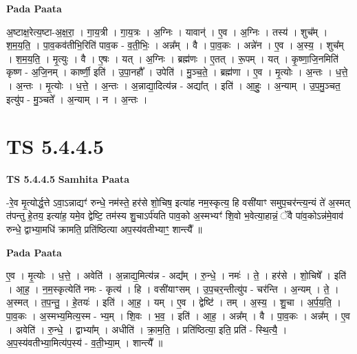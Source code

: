 \documentclass[17pt]{extarticle}
\begin{document}
\textbf{Pada Paata} \newline

अ॒ष्टाक्ष॒रेत्य॒ष्टा-अ॒क्ष॒रा॒ । गा॒य॒त्री । गा॒य॒त्रः । अ॒ग्निः । यावान्॑ । ए॒व । अ॒ग्निः । तस्य॑ । शुच᳚म् । श॒म॒य॒ति॒ । पा॒व॒कव॑तीभि॒रिति॑ पाव॒क - व॒ती॒भिः॒ । अन्न᳚म् । वै । पा॒व॒कः । अन्ने॑न । ए॒व । अ॒स्य॒ । शुच᳚म् । श॒म॒य॒ति॒ । मृ॒त्युः । वै ।   ए॒षः । यत् । अ॒ग्निः । ब्रह्म॑णः । ए॒तत् । रू॒पम् । यत् । कृ॒ष्णा॒जि॒नमिति॑ कृष्ण - अ॒जि॒नम् । कार्ष्णी॒ इति॑ । उ॒पा॒नहौ᳚ । उपेति॑ । मु॒ञ्च॒ते॒ । ब्रह्म॑णा । ए॒व । मृ॒त्योः । अ॒न्तः । ध॒त्ते॒ । अ॒न्तः । मृ॒त्योः । ध॒त्ते॒ । अ॒न्तः । अ॒न्नाद्या॒दित्य॑न्न - अद्या᳚त् । इति॑ । आ॒हुः॒ । अ॒न्याम् । उ॒प॒मु॒ञ्चत॒ इत्यु॑प - मु॒ञ्चते᳚ । अ॒न्याम् । न । अ॒न्तः ।  \newline




\section*{ TS 5.4.4.5 }

\textbf{TS 5.4.4.5 } \newline
\textbf{Samhita Paata} \newline

-रे॒व मृ॒त्योर्द्ध॒त्ते ऽवा॒ऽन्नाद्यꣳ॑ रुन्धे॒ नम॑स्ते॒ हर॑से शो॒चिष॒ इत्या॑ह नम॒स्कृत्य॒ हि वसी॑याꣳ समुप॒चर॑न्त्य॒न्यं ते॑ अ॒स्मत् त॑पन्तु हे॒तय॒ इत्या॑ह॒ यमे॒व द्वेष्टि॒ तम॑स्य शु॒चाऽर्प॑यति पाव॒को अ॒स्मभ्यꣳ॑ शि॒वो भ॒वेत्या॒हान्नं॒ ॅवै पा॑व॒कोऽन्न॑मे॒वाव॑ रुन्धे॒ द्वाभ्या॒मधि॑ क्रामति॒ प्रति॑ष्ठित्या अप॒स्य॑वतीभ्याꣳ॒॒ शान्त्यै᳚ ॥ \newline

\textbf{Pada Paata} \newline

ए॒व । मृ॒त्योः । ध॒त्ते॒ । अवेति॑ । अ॒न्नाद्य॒मित्य॑न्न - अद्य᳚म् । रु॒न्धे॒ । नमः॑ । ते॒ । हर॑से । शो॒चिषे᳚ । इति॑ । आ॒ह॒ । न॒म॒स्कृत्येति॑ नमः - कृत्य॑ । हि । वसी॑याꣳसम् । उ॒प॒चर॒न्तीत्यु॑प - चर॑न्ति । अ॒न्यम् । ते॒ । अ॒स्मत् । त॒प॒न्तु॒ । हे॒तयः॑ । इति॑ । आ॒ह॒ । यम् । ए॒व । द्वेष्टि॑ । तम् । अ॒स्य॒ । शु॒चा । अ॒र्प॒य॒ति॒ । पा॒व॒कः । अ॒स्मभ्य॒मित्य॒स्म - भ्य॒म् । शि॒वः । भ॒व॒ । इति॑ । आ॒ह॒ । अन्न᳚म् । वै । पा॒व॒कः । अन्न᳚म् । ए॒व । अवेति॑ । रु॒न्धे॒ । द्वाभ्या᳚म् । अधीति॑ । क्रा॒म॒ति॒ । प्रति॑ष्ठित्या॒ इति॒ प्रति॑ - स्थि॒त्यै॒ । अ॒प॒स्य॑वतीभ्या॒मित्य॑प॒स्य॑ - व॒ती॒भ्या॒म् । शान्त्यै᳚ ॥  \newline
\end{document}
